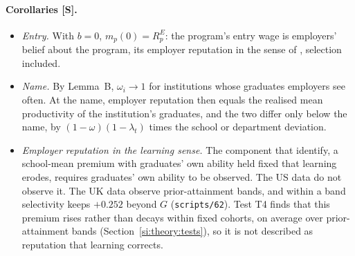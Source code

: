 \documentclass[11pt]{article}
\begin{document}
\paragraph{Corollaries [S].}
\begin{itemize}
\item \emph{Entry.} With $b=0$, $m_p(0)=R^E_p$: the program's entry wage is employers' belief about the program,
its employer reputation in the sense of \citet{macleod2015reputation}, selection included.
\item \emph{Name.} By Lemma~B, $\omega_i\to1$ for institutions whose graduates employers see often. At the name,
employer reputation then equals the realised mean productivity of the institution's graduates, and the two differ
only below the name, by $(1-\omega)(1-\lambda_t)$ times the school or department deviation.
\item \emph{Employer reputation in the learning sense.} The component that \citet{macleod2017big} identify, a
school-mean premium with graduates' own ability held fixed that learning erodes, requires graduates' own ability
to be observed. The US data do not observe it. The UK data observe prior-attainment bands, and within a band selectivity keeps $+0.252$ beyond $G$ (\texttt{scripts/62}). Test T4 finds that this premium
rises rather than decays within fixed cohorts, on average over prior-attainment bands (Section~\ref{si:theory:tests}), so it is not described as
reputation that learning corrects.
\end{itemize}
\end{document}
